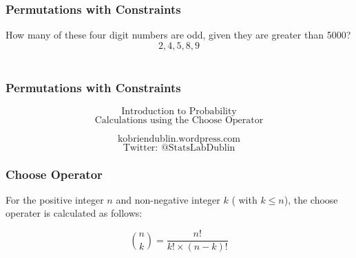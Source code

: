 \documentclass[IntroMain.tex]{subfiles}
\begin{document}
	\begin{frame}
		\frametitle{Permutations with Constraints}
		\Large
		\vspace{-3cm}
		How many of these four digit numbers are odd, given they are greater than 5000?
		\[2,4,5,8,9\]\\
		
	\end{frame}
	
	
	\begin{frame}
		\frametitle{Permutations with Constraints}
		\Large
		
		
	\end{frame}
	
	
	
	
	\begin{frame}
		\Huge
		\[\mbox{Introduction to Probability}\]
		\LARGE
		\[\mbox{Calculations using the Choose Operator}\]
		
		\Large
		\[\mbox{kobriendublin.wordpress.com}\]
		\[\mbox{Twitter: @StatsLabDublin}\]
		
	\end{frame}
	
	\begin{frame}
		\frametitle{Choose Operator}
		\Large
		For the positive integer $n$ and non-negative integer $k$ ( with $k\leq n$), the choose operater is calculated as follows:
		
		\[ {n \choose k} = \frac{n!}{k! \times (n-k)!} \]
		
	\end{frame}
	
\end{document}
